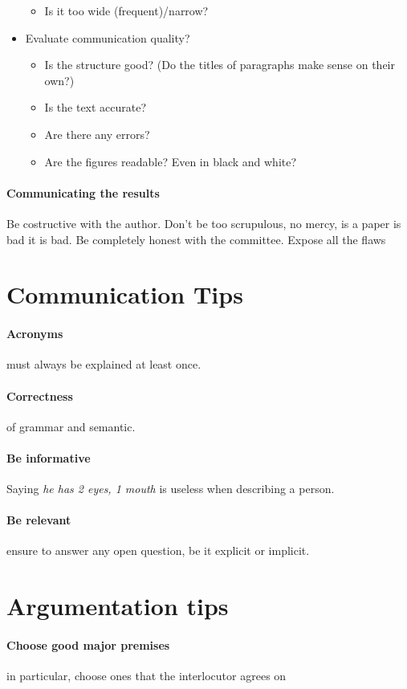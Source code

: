 \documentclass{article}
\begin{document}
\begin{itemize}
\begin{itemize}
	\item Is it too wide (frequent)/narrow?
	\end{itemize}
\item Evaluate communication quality?
	\begin{itemize}
	\item Is the structure good? (Do the titles of paragraphs make sense on their own?)
	\item Is the text accurate?
	\item Are there any errors?
	\item Are the figures readable? Even in black and white?
	\end{itemize}
\end{itemize}
\paragraph{Communicating the results} Be costructive with the author. Don't be too scrupulous, no mercy, is a paper is bad it is bad. Be completely honest with the committee. Expose all the flaws




\appendix
\section{Communication Tips}
\paragraph{Acronyms} must always be explained at least once.
\paragraph{Correctness} of grammar and semantic.
\paragraph{Be informative} Saying \textit{he has 2 eyes, 1 mouth} is useless when describing a person.
\paragraph{Be relevant} ensure to answer any open question, be it explicit or implicit.

\section{Argumentation tips}
\paragraph{Choose good major premises} in particular, choose ones that the interlocutor agrees on
\end{document}
